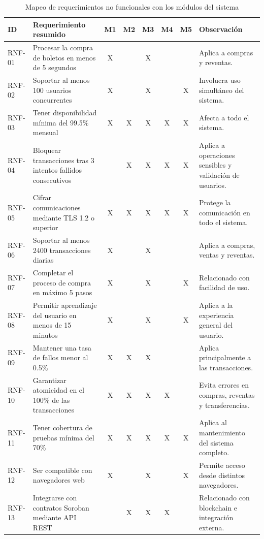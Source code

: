 \documentclass[12pt,letterpaper]{article}
\begin{document}
\begin{table}[htbp]
\centering
\scriptsize
\caption{Mapeo de requerimientos no funcionales con los módulos del sistema}
\label{tab:mapeo_rnf_modulos}

\begin{tabularx}{\textwidth}{|p{1.2cm}|X|c|c|c|c|c|X|}
\hline
\textbf{ID} & \textbf{Requerimiento resumido} & \textbf{M1} & \textbf{M2} & \textbf{M3} & \textbf{M4} & \textbf{M5} & \textbf{Observación} \\ \hline

RNF-01 & Procesar la compra de boletos en menos de 5 segundos & X &  & X &  &  & Aplica a compras y reventas. \\ \hline
RNF-02 & Soportar al menos 100 usuarios concurrentes & X &  & X &  & X & Involucra uso simultáneo del sistema. \\ \hline
RNF-03 & Tener disponibilidad mínima del 99.5\% mensual & X & X & X & X & X & Afecta a todo el sistema. \\ \hline
RNF-04 & Bloquear transacciones tras 3 intentos fallidos consecutivos &  & X & X & X & X & Aplica a operaciones sensibles y validación de usuarios. \\ \hline
RNF-05 & Cifrar comunicaciones mediante TLS 1.2 o superior & X & X & X & X & X & Protege la comunicación en todo el sistema. \\ \hline
RNF-06 & Soportar al menos 2400 transacciones diarias & X &  & X &  &  & Aplica a compras, ventas y reventas. \\ \hline
RNF-07 & Completar el proceso de compra en máximo 5 pasos & X &  & X &  & X & Relacionado con facilidad de uso. \\ \hline
RNF-08 & Permitir aprendizaje del usuario en menos de 15 minutos & X &  & X &  & X & Aplica a la experiencia general del usuario. \\ \hline
RNF-09 & Mantener una tasa de fallos menor al 0.5\% & X & X & X &  &  & Aplica principalmente a las transacciones. \\ \hline
RNF-10 & Garantizar atomicidad en el 100\% de las transacciones & X & X & X & X &  & Evita errores en compras, reventas y transferencias. \\ \hline
RNF-11 & Tener cobertura de pruebas mínima del 70\% & X & X & X & X & X & Aplica al mantenimiento del sistema completo. \\ \hline
RNF-12 & Ser compatible con navegadores web & X &  & X &  & X & Permite acceso desde distintos navegadores. \\ \hline
RNF-13 & Integrarse con contratos Soroban mediante API REST &  & X & X & X &  & Relacionado con blockchain e integración externa. \\ \hline

\end{tabularx}
\end{table}
\end{document}
